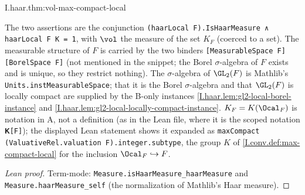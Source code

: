 \begin{theorem}[volume of $K_F$]
\end{theorem}
\begin{tfformal}{I.haar.thm:vol-max-compact-local}
\begin{tffidelity}
The two assertions are the conjunction \texttt{(haarLocal F).IsHaarMeasure ∧ haarLocal F K = 1}, with $\vol$ the measure of the set $K_F$ (coerced to a set). The measurable structure of $F$ is carried by the two binders \texttt{[MeasurableSpace F] [BorelSpace F]} (not mentioned in the snippet; the Borel $\sigma$-algebra of $F$ exists and is unique, so they restrict nothing). The $\sigma$-algebra of $\GL_2(F)$ is Mathlib's \texttt{Units.instMeasurableSpace}; that it is the Borel $\sigma$-algebra and that $\GL_2(F)$ is locally compact are supplied by the B-only instances \cref{I.haar.lem:gl2-local-borel-instance} and \cref{I.haar.lem:gl2-local-locally-compact-instance}. $K_F=K(\Ocal_F)$ is notation in A, not a definition (as in the Lean file, where it is the scoped notation \texttt{𝐊[F]}); the displayed Lean statement shows it expanded as \texttt{maxCompact (ValuativeRel.valuation F).integer.subtype}, the group $K$ of \cref{I.conv.def:max-compact-local} for the inclusion $\Ocal_F\hookrightarrow F$.
\end{tffidelity}
\end{tfformal}
\begin{proof}[Lean proof]
Term-mode: \texttt{Measure.isHaarMeasure\_haarMeasure} and \texttt{Measure.haarMeasure\_self} (the normalization of Mathlib's Haar measure).
\end{proof}


